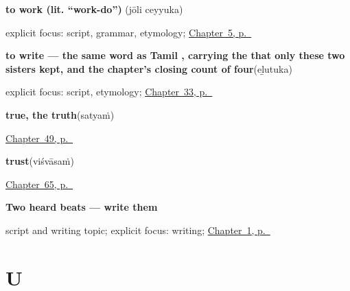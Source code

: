 \noindent\begin{minipage}[t]{\linewidth}
\raggedright
\textbf{to work (lit. \textquotedblleft{}work-do\textquotedblright{})}\enspace\emph{ }\enspace(jōli ceyyuka)\par
\footnotesize explicit focus: script, grammar, etymology; \hyperref[ch:first-verbs]{Chapter~5, p.~\pageref*{ch:first-verbs}}
\end{minipage}\par\smallskip

\noindent\begin{minipage}[t]{\linewidth}
\raggedright
\textbf{to write — the same word as Tamil , carrying the  that only these two sisters kept, and the chapter's closing count of four}\enspace\emph{}\enspace(eḻutuka)\par
\footnotesize explicit focus: script, etymology; \hyperref[ch:ml-mind-and-page]{Chapter~33, p.~\pageref*{ch:ml-mind-and-page}}
\end{minipage}\par\smallskip

\noindent\begin{minipage}[t]{\linewidth}
\raggedright
\textbf{true, the truth}\enspace\emph{}\enspace(satyaṁ)\par
\footnotesize \hyperref[ch:ml-replies]{Chapter~49, p.~\pageref*{ch:ml-replies}}
\end{minipage}\par\smallskip

\noindent\begin{minipage}[t]{\linewidth}
\raggedright
\textbf{trust}\enspace\emph{}\enspace(viśvāsaṁ)\par
\footnotesize \hyperref[ch:ml-asking-well]{Chapter~65, p.~\pageref*{ch:ml-asking-well}}
\end{minipage}\par\smallskip

\noindent\begin{minipage}[t]{\linewidth}
\raggedright
\textbf{Two heard beats — write them}\par
\footnotesize script and writing topic; explicit focus: writing; \hyperref[ch:greetings]{Chapter~1, p.~\pageref*{ch:greetings}}
\end{minipage}\par\smallskip

\section*{U}

